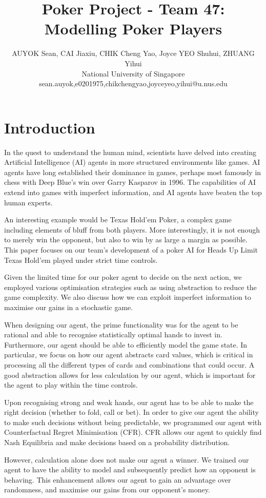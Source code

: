 \documentclass{article}
\title{Poker Project - Team 47: Modelling Poker Players}
\author{
AUYOK Sean, CAI Jiaxiu, CHIK Cheng Yao, Joyce YEO Shuhui, ZHUANG Yihui
\\ 
National University of Singapore\\
sean.auyok,e0201975,chikchengyao,joyceyeo,yihui@u.nus.edu
}
\begin{document}
\maketitle

\section{Introduction}

In the quest to understand the human mind, scientists have delved into creating Artificial Intelligence (AI) agents in more structured environments like games. AI agents have long established their dominance in games, perhaps most famously in chess with Deep Blue's win over Garry Kasparov in 1996. The capabilities of AI extend into games with imperfect information, and AI agents have beaten the top human experts. 

An interesting example would be Texas Hold'em Poker, a complex game including elements of bluff from both players. More interestingly, it is not enough to merely win the opponent, but also to win by as large a margin as possible. This paper focuses on our team's development of a poker AI for Heads Up Limit Texas Hold'em played under strict time controls. 

Given the limited time for our poker agent to decide on the next action, we employed various optimisation strategies such as using abstraction to reduce the game complexity. We also discuss how we can exploit imperfect information to maximise our gains in a stochastic game.

When designing our agent, the prime functionality was for the agent to be rational and able to recognise statistically optimal hands to invest in. Furthermore, our agent should be able to efficiently model the game state. In particular, we focus on how our agent abstracts card values, which is critical in processing all the different types of cards and combinations that could occur. A good abstraction allows for less calculation by our agent, which is important for the agent to play within the time controls.

Upon recognising strong and weak hands, our agent has to be able to make the right decision (whether to fold, call or bet). In order to give our agent the ability to make such decisions without being predictable, we programmed our agent with Counterfactual Regret Minimisation (CFR). CFR allows our agent to quickly find Nash Equilibria and make decisions based on a probability distribution.

However, calculation alone does not make our agent a winner. We trained our agent to have the ability to model and subsequently predict how an opponent is behaving. This enhancement allows our agent to gain an advantage over randomness, and maximise our gains from our opponent's money.
\end{document}
